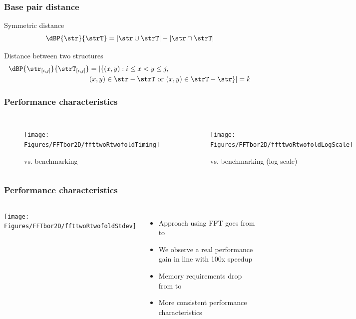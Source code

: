 \documentclass{beamer}
\begin{document}
\begin{frame}
  \frametitle{Base pair distance}
  \begin{block}
    {Symmetric distance}
    \begin{align*}
      \dBP{\str}{\strT} = |\str \cup \strT| - |\str \cap \strT|
    \end{align*}
  \end{block}
  \begin{block}
    {Distance between two structures}
    \begin{align*}
      \begin{split}
        \dBP{\str_{[i,j]}}{\strT_{[i,j]}} &= |\{ (x,y): i \leq x<y\leq j, \\
        & (x,y) \in \str - \strT \text{ or } (x,y) \in \strT - \str \}| = k
      \end{split}
    \end{align*}
  \end{block}
\end{frame}

\begin{frame}
	\frametitle{Performance characteristics}
	\begin{columns}
		\begin{figure}
      \texttt{[image: Figures/FFTbor2D/ffttwoRtwofoldTiming]}
      \caption{\ffttwo vs. \rnatwofold benchmarking}
    \end{figure}

    \begin{figure}
      \texttt{[image: Figures/FFTbor2D/ffttwoRtwofoldLogScale]}
      \caption{\ffttwo vs. \rnatwofold benchmarking (log scale)}
    \end{figure}
	\end{columns}
\end{frame}

\begin{frame}
	\frametitle{Performance characteristics}
	\begin{columns}
		\column{.5\textwidth}
		\texttt{[image: Figures/FFTbor2D/ffttwoRtwofoldStdev]}

		\column{.5\textwidth}
		\begin{itemize}
			\item Approach using FFT goes from  to \On{5}
			\item We observe a real performance gain in line with 100x speedup
			\item Memory requirements drop from  to \On{2}
			\item More consistent performance characteristics
		\end{itemize}
	\end{columns}
\end{frame}
\end{document}
